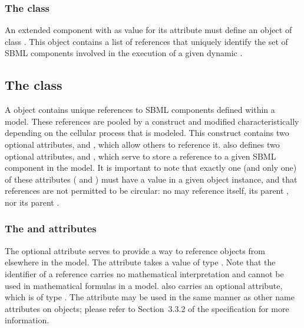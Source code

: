 \subsubsection{The  class}
\label{subsec:ListOfDynElements}
An extended \Event component with  as value for its  attribute must define an object of class \ListOfDynElements. This object contains a list of \DynElement references that uniquely identify the set of SBML components involved in the execution of a given dynamic \Event.

\subsection{The  class}
\label{subsec:DynElement}
A \DynElement object contains unique references to SBML components defined within a model. These references are pooled by a \ListOfDynElements construct and modified characteristically depending on the cellular process that is modeled. This construct contains two optional attributes,  and , which allow others to reference it. \DynElement also defines two optional attributes,  and , which serve to store a reference to a given SBML component in the model. It is important to note that exactly one (and only one) of these attributes ( and ) must have a value in a given \DynElement object instance, and that references are not permitted to be circular: no \DynElement may reference itself, its parent \ListOfDynElements, nor its parent \Event.

\subsubsection{The  and  attributes}
\label{attr:idNameDynElement}

The optional  attribute serves to provide a way to reference \DynElement objects from elsewhere in the model.
The attribute takes a value of type . Note that the identifier of a \DynElement reference carries no mathematical
interpretation and cannot be used in mathematical formulas in a model. \DynElement also carries an optional 
attribute, which is of type . The  attribute may be used in the same manner as other name attributes on \sbmlthreecore objects; please refer to Section~3.3.2 of the \sbmlthreecore specification for more information.

